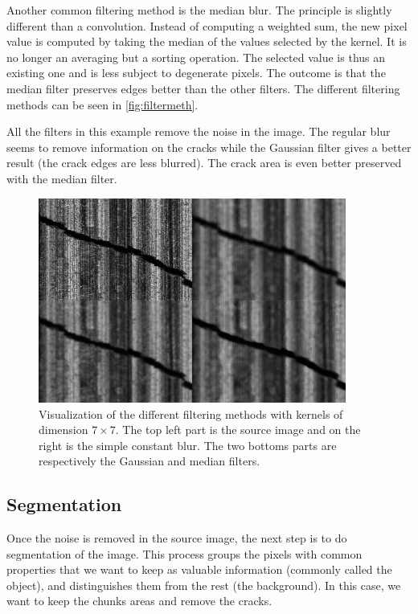 Another common filtering method is the median blur. The principle is slightly different than a convolution. Instead of computing a weighted sum, the new pixel value is computed by taking the median of the values selected by the kernel. It is no longer an averaging but a sorting operation. The selected value is thus an existing one and is less subject to degenerate pixels. The outcome is that the median filter preserves edges better than the other filters. The different filtering methods can be seen in \autoref{fig:filtermeth}.

All the filters in this example remove the noise in the image. The regular blur seems to remove information on the cracks while the Gaussian filter gives a better result (the crack edges are less blurred). The crack area is even better preserved with the median filter.

\begin{figure}[!ht]
\centering
\includegraphics[width=0.9\textwidth]{images/filter-methods}
\caption[Visualization of the different filtering methods]
{Visualization of the different filtering methods with kernels of dimension $7 \times 7$. The top left part is the source image and on the right is the simple constant blur. The two bottoms parts are respectively the Gaussian and median filters.}
\label{fig:filtermeth}
\end{figure}

\subsection{Segmentation}

Once the noise is removed in the source image, the next step is to do segmentation of the image. This process groups the pixels with common properties that we want to keep as valuable information (commonly called the object), and distinguishes them from the rest (the background). In this case, we want to keep the chunks areas and remove the cracks.

